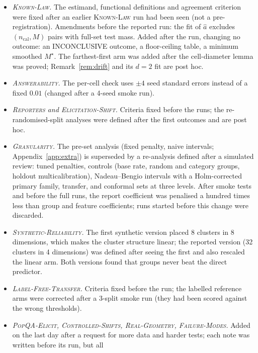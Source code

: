 \documentclass[twoside]{article}
\theoremstyle{definition}
\theoremstyle{remark}
\newcommand{\1}{\mathbf{1}}
\newcommand{\expname}[1]{\textsc{#1}}
\begin{document}
\begin{itemize}
  \item \emph{\expname{Known-Law}.} The estimand, functional definitions and agreement criterion were fixed after an
  earlier \expname{Known-Law} run had been seen (not a pre-registration). Amendments before the reported run: the fit of
  $\hat a$ excludes $(n_{\mathrm{cal}},M)$ pairs with full-set test mass. Added after the run, changing no
  outcome: an INCONCLUSIVE outcome, a floor-ceiling table, a minimum smoothed $M^\star$. The farthest-first
  arm was added after the cell-diameter lemma was proved; Remark~\ref{rem:drift} and its $d=2$ fit are
  post hoc.
  \item \emph{\expname{Answerability}.} The per-cell check uses $\pm4$ seed standard errors instead of a fixed $0.01$
  (changed after a 4-seed smoke run).
  \item \emph{\expname{Reporters} and \expname{Elicitation-Shift}.} Criteria fixed before the runs; the re-randomised-split analyses
  were defined after the first outcomes and are post hoc.
  \item \emph{\expname{Granularity}.} The pre-set analysis (fixed penalty, naive intervals; Appendix~\ref{app:extra}) is
  superseded by a re-analysis defined after a simulated review: tuned penalties, controls (base rate,
  random and category groups, holdout multicalibration), Nadeau--Bengio intervals with a Holm-corrected
  primary family, transfer, and conformal sets at three levels. After smoke tests and before the full
  runs, the report coefficient was penalised a hundred times less than group and feature coefficients;
  runs started before this change were discarded.
  \item \emph{\expname{Synthetic-Reliability}.} The first synthetic version placed 8 clusters in 8 dimensions, which makes the cluster
  structure linear; the reported version (32 clusters in 4 dimensions) was defined after seeing the
  first and also rescaled the linear arm. Both versions found that groups never beat the direct predictor.
  \item \emph{\expname{Label-Free-Transfer}.} Criteria fixed before the run; the labelled reference arms were corrected after a
  3-split smoke run (they had been scored against the wrong thresholds).
  \item \emph{\expname{PopQA-Elicit}, \expname{Controlled-Shifts}, \expname{Real-Geometry}, \expname{Failure-Modes}.} Added on the
  last day after a request for more data and harder tests; each note was written before its run, but all

\end{itemize}
\end{document}
